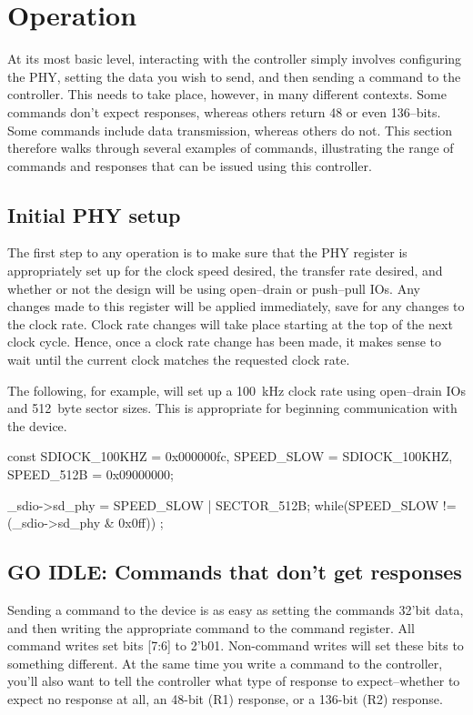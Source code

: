 \documentclass{gqtekspec}
\begin{document}
\chapter{Operation}\label{ch:ops}
At its most basic level, interacting with the controller simply involves
configuring the PHY, setting the data you wish to send, and then sending a
command to the controller.  This needs to take place, however, in many
different contexts.  Some commands don't expect responses, whereas others
return 48 or even 136--bits.  Some commands include data transmission,
whereas others do not.  This section therefore walks through several
examples of commands, illustrating the range of commands and responses
that can be issued using this controller.

\section{Initial PHY setup}
The first step to any operation is to make sure that the PHY register
is appropriately set up for the clock speed desired, the transfer rate
desired, and whether or not the design will be using open--drain or push--pull
IOs.  Any changes made to this register will be applied immediately, save
for any changes to the clock rate.  Clock rate changes will take place starting
at the top of the next clock cycle.  Hence, once a clock rate change has been
made, it makes sense to wait until the current clock matches the requested
clock rate.

The following, for example, will set up a 100~kHz clock rate using open--drain
IOs and 512~byte sector sizes.  This is appropriate for beginning communication
with the device.

\begin{CPP}
	const	SDIOCK_100KHZ = 0x000000fc,
		SPEED_SLOW    = SDIOCK_100KHZ,
		SPEED_512B    = 0x09000000;

	_sdio->sd_phy = SPEED_SLOW | SECTOR_512B;
	while(SPEED_SLOW != (_sdio->sd_phy & 0x0ff))
		;
\end{CPP}
\section{GO IDLE: Commands that don't get responses}
Sending a command to the device is as easy as setting the commands 32'bit
data, and then writing the appropriate command to the command register.
All command writes set bits [7:6] to 2'b01.  Non-command writes will set these
bits to something different.  At the same time you write a command to the
controller, you'll also want to tell the controller what type of
response to expect--whether to expect no response at all, an 48-bit (R1)
response, or a 136-bit (R2) response.
\end{document}
